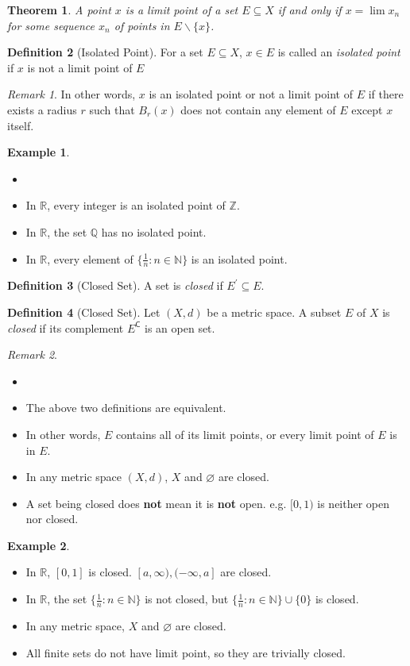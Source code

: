 \documentclass[12pt, lettersize]{book}
\theoremstyle{plain}
\newtheorem{thm}{Theorem}[section]
\theoremstyle{definition}
\newtheorem{dfn}[thm]{Definition}
\newtheorem*{eg}{Example}
\theoremstyle{remark}
\newtheorem*{rem}{Remark}
\newcommand{\R}{\mathbb{R}}
\newcommand{\N}{\mathbb{N}}
\newcommand{\Q}{\mathbb{Q}}
\newcommand{\com}{\mathsf{C}}
\let\emptyset\varnothing
\begin{document}
	\begin{thm}
		A point $x$ is a limit point of a set $E\subseteq X$ if and only if $x=\lim x_n$ for some sequence $x_n$ of points in $E\backslash\{x\}$. 
	\end{thm}
	
	\begin{dfn}[Isolated Point]
		For a set $E\subseteq X$, $x\in E$ is called an \emph{isolated point} if $x$ is not a limit point of $E$
	\end{dfn}
	\begin{rem}
		In other words, $x$ is an isolated point or not a limit point of $E$ if there exists a radius $r$ such that $B_r(x)$ does not contain any element of $E$ except $x$ itself.
	\end{rem}
	\begin{eg}
		\begin{itemize}
			\item[]
			\item In $\R$, every integer is an isolated point of $\mathbb{Z}$.
			\item In $\R$, the set $\Q$ has no isolated point.
			\item In $\R$, every element of $\{\frac{1}{n}: n\in\N\}$ is an isolated point. 
		\end{itemize}
	\end{eg}
	
	\begin{dfn}[Closed Set]
		A set is \emph{closed} if $E^\prime\subseteq E$.
	\end{dfn}
	\begin{dfn}[Closed Set]
		Let $(X,d)$ be a metric space. A subset $E$ of $X$ is \emph{closed} if its complement $E^\com$ is an open set.
	\end{dfn}
	\begin{rem}
		\begin{itemize}
			\item[]
			\item The above two definitions are equivalent.
			\item In other words, $E$ contains all of its limit points, or every limit point of $E$ is in $E$.
			\item In any metric space $(X,d)$, $X$ and $\emptyset$ are closed.
			\item A set being closed does \textbf{not} mean it is \textbf{not} open. e.g. $[0,1)$ is neither open nor closed.
		\end{itemize}
	\end{rem}
	\begin{eg}
		\begin{itemize}
			\item In $\R$, $[0,1]$ is closed. $[a,\infty),(-\infty,a]$ are closed.
			\item In $\R$, the set $\{\frac{1}{n}: n\in\N\}$ is not closed, but $\{\frac{1}{n}: n\in\N\}\cup\{0\}$ is closed.
			\item In any metric space, $X$ and $\emptyset$ are closed.
			\item All finite sets do not have limit point, so they are trivially closed.
		\end{itemize}
	\end{eg}
	
\end{document}
